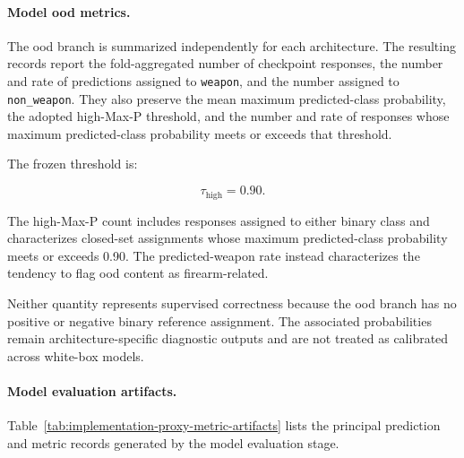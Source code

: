 \paragraph{Model \gls{ood} metrics.}

The \gls{ood} branch is summarized independently for each architecture.
The resulting records report the fold-aggregated number of checkpoint responses,
the number and rate of predictions assigned to \texttt{weapon}, and the number
assigned to \texttt{non\_weapon}. They also preserve the mean maximum
predicted-class probability, the adopted high-Max-P threshold, and the number
and rate of responses whose maximum predicted-class probability meets or exceeds
that threshold.

The frozen threshold is:

\begin{equation}
\tau_{\mathrm{high}}
=
0.90.
\end{equation}

The high-Max-P count includes responses assigned to either binary class and
characterizes closed-set assignments whose maximum predicted-class probability
meets or exceeds 0.90. The predicted-weapon rate instead characterizes the
tendency to flag \gls{ood} content as firearm-related.

Neither quantity represents supervised correctness because the \gls{ood}
branch has no positive or negative binary reference assignment. The associated
probabilities remain architecture-specific diagnostic outputs and are not
treated as calibrated across white-box models.


\paragraph{Model evaluation artifacts.}

Table~\ref{tab:implementation-proxy-metric-artifacts} lists the principal
prediction and metric records generated by the model evaluation stage.

